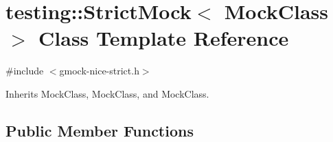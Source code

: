 \hypertarget{classtesting_1_1_strict_mock}{}\section{testing\+::Strict\+Mock$<$ Mock\+Class $>$ Class Template Reference}
\label{classtesting_1_1_strict_mock}


{\ttfamily \#include $<$gmock-\/nice-\/strict.\+h$>$}



Inherits Mock\+Class, Mock\+Class, and Mock\+Class.

\subsection*{Public Member Functions}
